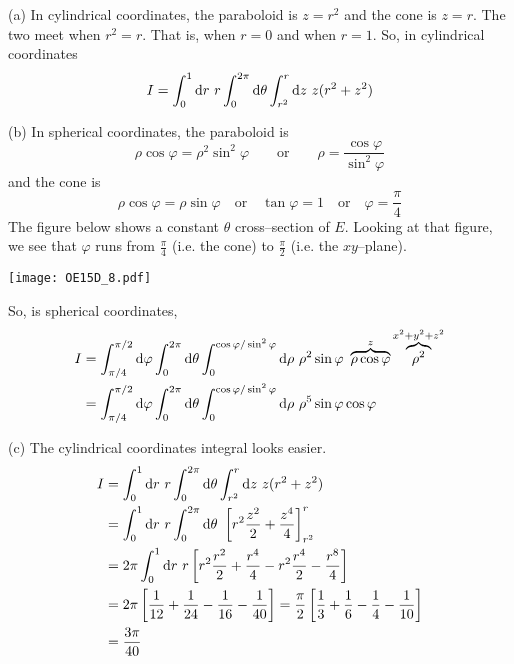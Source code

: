 \begin{solution}
(a)
In cylindrical coordinates, the paraboloid is $z=r^2$ and
the cone is $z=r$. The two meet when $r^2=r$. That is, when $r=0$
and when $r=1$. So, in cylindrical coordinates
\begin{align*}
I = \int_0^1 \mathrm{d}r\ r \int_0^{2\pi}\mathrm{d}\theta \int_{r^2}^r\mathrm{d}z\
           z(r^2+z^2)
\end{align*}

(b) In spherical coordinates, the paraboloid is 
\begin{equation*}
\rho\cos\varphi=\rho^2\sin^2\varphi\qquad\text{or}\qquad
     \rho=\frac{\cos\varphi}{\sin^2\varphi}
\end{equation*}
and the cone is 
\begin{equation*}
\rho\cos\varphi=\rho\sin\varphi\quad\text{or}\quad
\tan\varphi=1\quad\text{or}\quad
\varphi=\frac{\pi}{4}
\end{equation*} 
The figure below shows  a constant $\theta$ cross--section of
$E$. Looking at that figure, we see that $\varphi$ runs from
$\frac{\pi}{4}$ (i.e. the cone) to $\frac{\pi}{2}$
(i.e. the $xy$--plane).

\begin{center}
\texttt{[image: OE15D\_8.pdf]}
\end{center}

So, is spherical coordinates,
\begin{align*}
I &= \int_{\pi/4}^{\pi/2} \dee{\varphi} \int_0^{2\pi}\dee{\theta}
         \int_0^{\cos\varphi/\sin^2\varphi} \dee{\rho}\ \rho^2\sin\varphi \ 
             \overbrace{\rho\cos\varphi}^{z}
             \overbrace{\rho^2}^{x^2+y^2+z^2} \\
&= \int_{\pi/4}^{\pi/2} \dee{\varphi} \int_0^{2\pi}\dee{\theta}
         \int_0^{\cos\varphi/\sin^2\varphi} \dee{\rho}\ \rho^5\sin\varphi 
             \cos\varphi
\end{align*}

(c) The cylindrical coordinates integral looks easier.
\begin{align*}
I &= \int_0^1 \dee{r}\ r \int_0^{2\pi}\dee{\theta} \int_{r^2}^r\dee{z}\
           z(r^2+z^2) \\
  &= \int_0^1 \dee{r}\ r \int_0^{2\pi}\dee{\theta}\ 
               \left[r^2\frac{z^2}{2}+\frac{z^4}{4}\right]_{r^2}^r \\
  &= 2\pi \int_0^1 \dee{r}\ r  
               \left[r^2\frac{r^2}{2}+\frac{r^4}{4}
               -r^2\frac{r^4}{2}-\frac{r^8}{4}\right] \\
  &=2\pi \left[\frac{1}{12}+\frac{1}{24}
               -\frac{1}{16}-\frac{1}{40}\right]
   =\frac{\pi}{2} \left[\frac{1}{3}+\frac{1}{6}
               -\frac{1}{4}-\frac{1}{10}\right] \\
   &=\frac{3\pi}{40}
\end{align*}
\end{solution}

